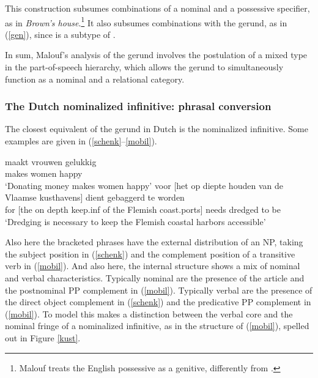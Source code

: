 \documentclass[output=paper]{langsci/langscibook}
\begin{document}
\noindent
This construction subsumes combinations of a nominal and a 
possessive specifier, as in \emph{Brown's house}.\footnote{Malouf treats 
the English possessive as a genitive, differently from \citet{SagWasow03}.}   
It also subsumes combinations with the gerund, as in (\ref{gen}), since 
 is a subtype of .  

In sum, Malouf's analysis of the gerund involves the postulation of a
mixed type in the part-of-speech hierarchy, which allows the gerund to simultaneously
function as a nominal and a relational category. 


\subsubsection{The Dutch nominalized infinitive: phrasal conversion } 


The closest equivalent of the gerund in Dutch is the nominalized infinitive. 
Some examples are given in (\ref{schenk}--\ref{mobil}). 

\begin{exe} 
\ex\label{schenk} 
 maakt vrouwen gelukkig  \\
       [money donate.{\sc inf}] makes women happy \\
\trans `Donating money makes women happy' 
\ex\label{mobil}   
\gll   voor [het op diepte houden van de Vlaamse kusthavens] dient gebaggerd te worden  \\  
       for [the on depth keep.{\sc inf} of the Flemish coast.ports] needs dredged to be \\
\trans `Dredging is necessary to keep the Flemish coastal harbors accessible'  
\end{exe} 

\noindent
Also here the bracketed phrases have the external distribution of an NP, 
taking the subject position in (\ref{schenk}) and 
the complement position of a transitive verb in (\ref{mobil}). 
And also here, the internal structure shows a mix of nominal and verbal
characteristics. 
Typically nominal are the presence of the article and the postnominal PP
complement in (\ref{mobil}). 
Typically verbal are the presence of the direct object complement in (\ref{schenk})
and the predicative PP complement in (\ref{mobil}). 
To model this \citet{VanEynde19} makes a distinction between the verbal core 
and the nominal fringe of a nominalized infinitive, as in the structure of 
(\ref{mobil}), spelled out in Figure \ref{kust}.  
\end{document}
